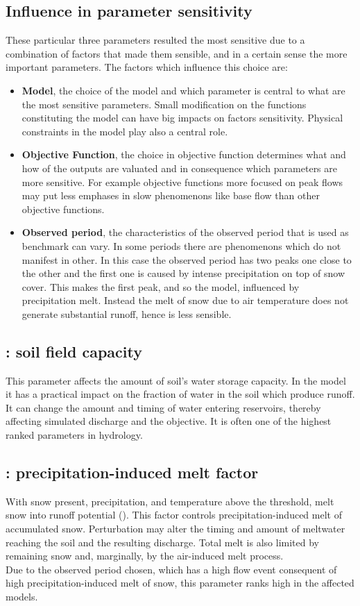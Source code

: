 \documentclass[11pt,a4paper]{article}
\newcommand{\param}[1]{\texttt{\detokenize{#1}}}
\begin{document}
\subsection{Influence in parameter sensitivity}
These particular three parameters resulted the most sensitive due to a combination of factors that made them sensible, and in a certain sense the more important parameters. The factors which influence this choice are:
\begin{itemize}
    \item \textbf{Model}, the choice of the model and which parameter is central to what are the most sensitive parameters. Small modification on the functions constituting the model can have big impacts on factors sensitivity. Physical constraints in the model play also a central role.
    \item \textbf{Objective Function}, the choice in objective function determines what and how of the outputs are valuated and in consequence which parameters are more sensitive. For example objective functions more focused on peak flows may put less emphases in slow phenomenons like base flow than other objective functions.\\
    \item \textbf{Observed period}, the characteristics of the observed period that is used as benchmark can vary. In some periods there are phenomenons which do not manifest in other. In this case the observed period has two peaks one close to the other and the first one is caused by intense precipitation on top of snow cover. This makes the first peak, and so the model, influenced by precipitation melt. Instead the melt of snow due to air temperature does not generate substantial runoff, hence is less sensible.
\end{itemize}


\subsection{\param{sl0_fcy}: soil field capacity}
This parameter affects the amount of soil's water storage capacity. In the model it has a practical impact on the fraction of water in the soil which produce runoff. It can change the amount and timing of water entering reservoirs, thereby affecting simulated discharge and the objective. It is often one of the highest ranked parameters in hydrology.
\subsection{\param{snw_pmf}: precipitation-induced melt factor}
With snow present, precipitation, and temperature above the threshold, melt snow into runoff potential (\param{rnf_pot}). This factor controls precipitation-induced melt of accumulated snow. Perturbation may alter the timing and amount of meltwater reaching the soil and the resulting discharge. Total melt is also limited by remaining snow and, marginally, by the air-induced melt process.\\
Due to the observed period chosen, which has a high flow event consequent of high precipitation-induced melt of snow, this parameter ranks high in the affected models.
\end{document}
